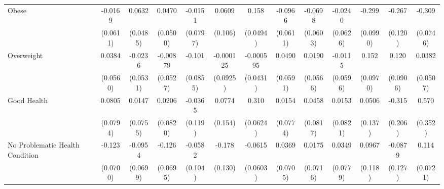 {\begin{tabular}{l*{12}{c}}
\addlinespace
Obese       &     -0.0169         &      0.0632         &      0.0470         &     -0.0151         &      0.0609         &       0.158\sym{**} &     -0.0966         &     -0.0698         &     -0.0240         &      -0.299\sym{**} &      -0.267\sym{*}  &      -0.309\sym{***}\\
            &    (0.0611)         &    (0.0485)         &    (0.0500)         &    (0.0797)         &     (0.106)         &    (0.0494)         &    (0.0611)         &    (0.0603)         &    (0.0626)         &    (0.0990)         &     (0.120)         &    (0.0746)         \\
\addlinespace
Overweight  &      0.0384         &     -0.0236         &    -0.00879         &      -0.101         &   -0.000125         &   -0.000595         &      0.0490         &      0.0190         &     -0.0115         &       0.152         &       0.120         &      0.0382         \\
            &    (0.0560)         &    (0.0531)         &    (0.0527)         &    (0.0855)         &    (0.0925)         &    (0.0431)         &    (0.0591)         &    (0.0566)         &    (0.0596)         &    (0.0970)         &    (0.0906)         &    (0.0507)         \\
\addlinespace
Good Health &      0.0805         &      0.0147         &      0.0206         &     -0.0365         &      0.0774         &       0.310\sym{***}&      0.0154         &      0.0458         &      0.0153         &      0.0506         &      -0.315         &       0.570         \\
            &    (0.0794)         &    (0.0755)         &    (0.0820)         &     (0.119)         &     (0.154)         &    (0.0624)         &    (0.0774)         &    (0.0817)         &    (0.0821)         &     (0.137)         &     (0.206)         &     (0.352)         \\
\addlinespace
No Problematic Health Condition&      -0.123         &     -0.0954         &      -0.126         &     -0.0582         &      -0.178         &     -0.0615         &      0.0369         &      0.0175         &      0.0349         &      0.0967         &     -0.0879         &       0.114         \\
            &    (0.0700)         &    (0.0699)         &    (0.0695)         &     (0.104)         &     (0.130)         &    (0.0603)         &    (0.0705)         &    (0.0716)         &    (0.0779)         &     (0.118)         &     (0.127)         &    (0.0721)         \\

\end{tabular}}

